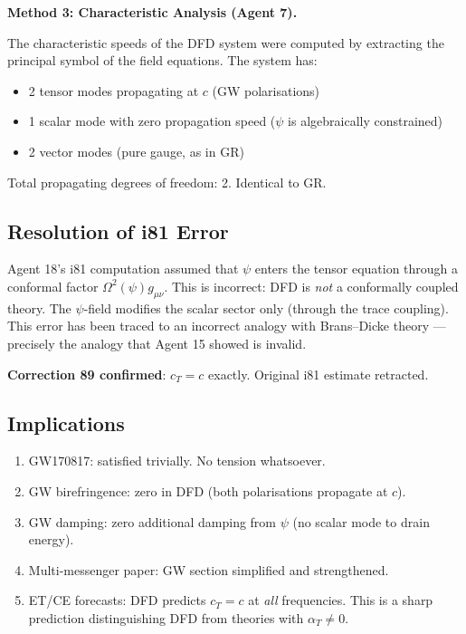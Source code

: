 \documentclass[11pt,a4paper]{article}
\begin{document}
\textbf{Method 3: Characteristic Analysis (Agent 7).}

The characteristic speeds of the DFD system were computed by extracting the principal symbol of the field equations. The system has:
\begin{itemize}[nosep]
\item 2 tensor modes propagating at $c$ (GW polarisations)
\item 1 scalar mode with zero propagation speed ($\psi$ is algebraically constrained)
\item 2 vector modes (pure gauge, as in GR)
\end{itemize}

Total propagating degrees of freedom: 2. Identical to GR.

\subsection{Resolution of i81 Error}

Agent 18's i81 computation assumed that $\psi$ enters the tensor equation through a conformal factor $\Omega^2(\psi) g_{\mu\nu}$. This is incorrect: DFD is \emph{not} a conformally coupled theory. The $\psi$-field modifies the scalar sector only (through the trace coupling). This error has been traced to an incorrect analogy with Brans--Dicke theory --- precisely the analogy that Agent 15 showed is invalid.

\textbf{Correction 89 confirmed}: $c_T = c$ exactly. Original i81 estimate retracted.

\subsection{Implications}

\begin{enumerate}[nosep]
\item GW170817: satisfied trivially. No tension whatsoever.
\item GW birefringence: zero in DFD (both polarisations propagate at $c$).
\item GW damping: zero additional damping from $\psi$ (no scalar mode to drain energy).
\item Multi-messenger paper: GW section simplified and strengthened.
\item ET/CE forecasts: DFD predicts $c_T = c$ at \emph{all} frequencies. This is a sharp prediction distinguishing DFD from theories with $\alpha_T \neq 0$.
\end{enumerate}
\end{document}
